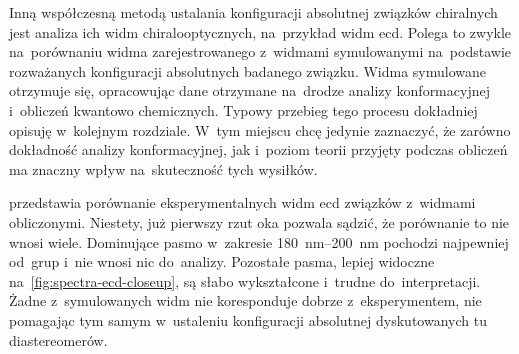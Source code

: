 Inną współczesną metodą ustalania konfiguracji absolutnej związków chiralnych jest analiza
  ich widm chiralooptycznych, na~przykład widm \gls{ecd}.
Polega to zwykle na~porównaniu widma zarejestrowanego z~widmami symulowanymi na~podstawie
  rozważanych konfiguracji absolutnych badanego związku.
Widma symulowane otrzymuje się, opracowując dane otrzymane na~drodze analizy konformacyjnej
  i~obliczeń kwantowo chemicznych.
Typowy przebieg tego procesu dokładniej opisuję w~kolejnym rozdziale. 
W~tym miejscu chcę jedynie zaznaczyć, że zarówno dokładność analizy konformacyjnej,
  jak i~poziom teorii przyjęty podczas obliczeń ma znaczny wpływ na~skuteczność tych wysiłków.

 przedstawia porównanie eksperymentalnych widm \gls{ecd} związków
   z~widmami obliczonymi.
Niestety, już pierwszy rzut oka pozwala sądzić, że porównanie to nie wnosi wiele.
Dominujące pasmo w~zakresie \SIrange{180}{200}{\nano\meter} pochodzi najpewniej od~grup
   i~nie wnosi nic do~analizy.
Pozostałe pasma, lepiej widoczne na~\cref{fig:spectra-ecd-closeup}, są słabo wykształcone
  i~trudne do~interpretacji.
Żadne z~symulowanych widm nie koresponduje dobrze z~eksperymentem, nie pomagając tym samym
  w~ustaleniu konfiguracji absolutnej dyskutowanych tu diastereomerów.

